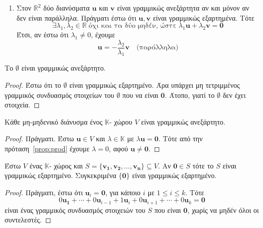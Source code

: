 \begin{examples}
\item {}
    \begin{enumerate}
        \item Στον $ \mathbb{R}^{2} $ δύο διανύσματα $ \mathbf{u} $ και $ \mathbf{v} $ 
            είναι γραμμικώς ανεξάρτητα αν και μόνον αν δεν είναι παράλληλα. Πράγματι 
            έστω ότι $ \mathbf{u}, \mathbf{v} $ είναι γραμμικώς εξαρτημένα. Τότε 
            \[
                \exists \lambda _{1}, \lambda _{2} \in \mathbb{R} \; 
                \text{όχι και τα δύο μηδέν, ώστε} 
                \; \lambda_{1} \mathbf{u} + \lambda_{2} \mathbf{v} = \mathbf{0} 
            \]
            Έτσι, αν έστω ότι $ \lambda_{1} \neq 0 $, έχουμε 
            \[
                \mathbf{u} = - \frac{\lambda _{2}}{\lambda _{1}} \mathbf{v} \quad  
                \text{(παράλληλα)}
            \] 
    \end{enumerate}
\end{examples}

\begin{prop}
   Το $ \emptyset $ είναι γραμμικώς ανεξάρτητο. 
\end{prop}
\begin{proof}
    Έστω ότι το $ \emptyset $ είναι γραμμικώς εξαρτημένο. Άρα υπάρχει μη τετριμμένος 
    γραμμικός συνδυασμός στοιχείων του $ \emptyset $ που να είναι 
    $ \mathbf{0} $. Άτοπο, γιατί το $ \emptyset $ δεν έχει στοιχεία.
\end{proof}

\begin{prop}
    Κάθε μη-μηδενικό διάνυσμα ένος $ \mathbb{K} $- χώρου $V$ είναι γραμμικώς 
    ανεξάρτητο.
\end{prop}
\begin{proof}
    Πράγματι. Έστω $ \mathbf{u} \in V $ και $ \lambda \in \mathbb{K} $ με 
    $ \lambda \mathbf{u} = \mathbf{0} $. Τότε από την πρόταση~\ref{prop:prod}  
    έχουμε $ \lambda = 0 $, αφού $ \mathbf{u} \neq \mathbf{0} $.
\end{proof}

\begin{prop}
    Έστω $V$ ένας $ \mathbb{K} $- χώρος και 
    $ S = \{ \mathbf{v_{1}}, \mathbf{v_{2}}, \ldots, \mathbf{v_{n}}  \} \subseteq V $.
    Αν $ \mathbf{0} \in S $ τότε το $S$ είναι γραμμικώς εξαρτημένο. Συγκεκριμένα 
    $ \{ \mathbf{0} \} $ είναι γραμμικώς εξαρτημένο.
\end{prop}
\begin{proof}
    Πράγματι, έστω ότι $ \mathbf{u}_{i} = \mathbf{0} $, για κάποιο $ i $ με 
    $ 1 \leq i \leq k $. Τότε
    \[
        0 \mathbf{u_{1}}+ \cdots + 0 \mathbf{u}_{i-1} + 1 \mathbf{u}_{i} + 0 
        \mathbf{u}_{i+1} + \cdots + 0 \mathbf{u}_{k} = \mathbf{0}  
     \]
     είναι ένας γραμμικός συνδυασμός στοιχειών του $S$ που είναι $ \mathbf{0} $, 
     χωρίς να μηδέν όλοι οι συντελεστές.
\end{proof}



